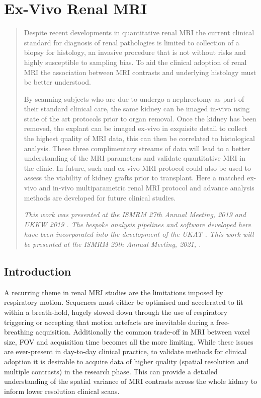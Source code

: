 \chapter{Ex-Vivo Renal MRI}
\label{chap:ex}
\newpage
\begin{abstract}
	Despite recent developments in quantitative renal \ac{MRI} the current clinical standard for diagnosis of renal pathologies is limited to collection of a  biopsy for histology, an invasive procedure that is not without risks and highly susceptible to sampling bias. To aid the clinical adoption of renal \ac{MRI} the association between \ac{MRI} contrasts and underlying histology must be better understood.	
	
	By scanning subjects who are due to undergo a nephrectomy as part of their standard clinical care, the same kidney can be imaged in-vivo using state of the art protocols prior to organ removal. Once the kidney has been removed, the explant can be imaged ex-vivo in exquisite detail to collect the highest quality of \ac{MRI} data, this can then be correlated to  histological analysis. These three complimentary streams of data will lead to a better understanding of the \ac{MRI} parameters and validate quantitative \ac{MRI} in the clinic. In future, such and ex-vivo \ac{MRI} protocol could also be used to assess the viability of kidney grafts prior to transplant. Here a matched ex-vivo and in-vivo multiparametric renal \ac{MRI} protocol and advance analysis methods are developed for future clinical studies.
	
	\textit{This work was presented at the \ac{ISMRM} 27th Annual Meeting, 2019 \cite{daniel_effects_2019} and \ac{UKKW} 2019 \cite{kazmi_determining_2019-1}. The bespoke analysis pipelines and software developed here have been incorporated into the development of the \ac{UKAT} \cite{nery_ukrin_2020}. This work will be presented at the \ac{ISMRM} 29th Annual Meeting, 2021, \cite{daniel_ukrin_2021}.}
\end{abstract}
\acresetall
\newpage
\section{Introduction}

A recurring theme in renal \ac{MRI} studies are the limitations imposed by respiratory motion. Sequences must either be optimised and accelerated to fit within a breath-hold, hugely slowed down through the use of respiratory triggering or accepting that motion artefacts are inevitable during a free-breathing acquisition. Additionally the common trade-off in \ac{MRI} between voxel size, \ac{FOV} and acquisition time becomes all the more limiting. While these issues are ever-present in day-to-day clinical practice, to validate methods for clinical adoption it is desirable to acquire data of higher quality (spatial resolution and multiple contrasts) in the research phase. This can provide a detailed understanding of the spatial variance of \ac{MRI} contrasts across the whole kidney to inform lower resolution clinical scans.

